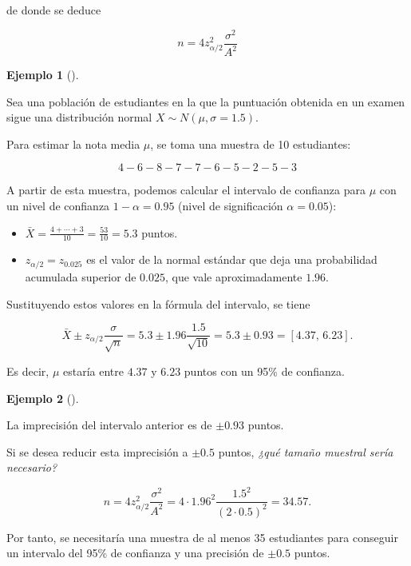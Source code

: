 \documentclass[
  a4paper,
]{scrreport}
\providecommand{\tightlist}{%
  \setlength{\itemsep}{0pt}\setlength{\parskip}{0pt}}\usepackage{longtable,booktabs,array}
\theoremstyle{plain}
\theoremstyle{definition}
\theoremstyle{definition}
\newtheorem{example}{Ejemplo}[chapter]
\theoremstyle{remark}
\begin{document}
de donde se deduce

\[
{n = 4 z_{\alpha/2}^2\frac{\sigma^2}{A^2}}
\]

\begin{example}[]\protect\hypertarget{exm-intervalo-confianza-media}{}\label{exm-intervalo-confianza-media}

Sea una población de estudiantes en la que la puntuación obtenida en un
examen sigue una distribución normal \(X\sim N(\mu,\sigma=1.5)\).

Para estimar la nota media \(\mu\), se toma una muestra de 10
estudiantes:

\[
4 - 6 - 8 - 7 - 7 - 6 - 5 - 2 - 5 - 3
\]

A partir de esta muestra, podemos calcular el intervalo de confianza
para \(\mu\) con un nivel de confianza \(1-\alpha=0.95\) (nivel de
significación \(\alpha=0.05\)):

\begin{itemize}
\tightlist
\item
  \(\bar X = \frac{4+\cdots+3}{10}= \frac{53}{10} = 5.3\) puntos.
\item
  \(z_{\alpha/2}=z_{0.025}\) es el valor de la normal estándar que deja
  una probabilidad acumulada superior de \(0.025\), que vale
  aproximadamente \(1.96\).
\end{itemize}

Sustituyendo estos valores en la fórmula del intervalo, se tiene

\[
\bar{X}\pm z_{\alpha/2}\frac{\sigma}{\sqrt{n}} = 5.3\pm 1.96\frac{1.5}{\sqrt{10}} = 5.3\pm 0.93 = \left[4.37,\,6.23\right].
\]

Es decir, \(\mu\) estaría entre \(4.37\) y \(6.23\) puntos con un 95\%
de confianza.

\end{example}

\begin{example}[]\protect\hypertarget{exm-tamaño-muestral-media}{}\label{exm-tamaño-muestral-media}

La imprecisión del intervalo anterior es de \(\pm 0.93\) puntos.

Si se desea reducir esta imprecisión a \(\pm 0.5\) puntos, \emph{¿qué
tamaño muestral sería necesario?}

\[
n = 4 z_{\alpha/2}^2\frac{\sigma^2}{A^2} = 4\cdot 1.96^2\frac{1.5^2}{(2\cdot 0.5)^2} = 34.57.
\]

Por tanto, se necesitaría una muestra de al menos 35 estudiantes para
conseguir un intervalo del 95\% de confianza y una precisión de \(\pm
0.5\) puntos.

\end{example}
\end{document}
